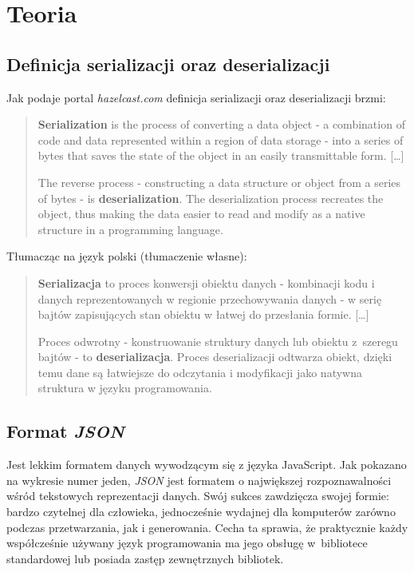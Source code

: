 \documentclass[12pt]{article}
\newcommand{\n}{\newline}
\newcommand{\nonpl}[1]{{\it #1}}
\newcommand{\JSON}{\nonpl{JSON} }
\begin{document}
	{
		\section{Teoria}

		{
			\subsection{Definicja serializacji oraz deserializacji}

			Jak podaje portal \nonpl{hazelcast.com}\cite{definitions_serial_and_deserial} definicja serializacji oraz deserializacji brzmi:

			\begin{quotation}
				{\bf Serialization} is the process of converting a data object - a combination of code
				and data represented within a region of data storage - into a series of bytes that
				saves the state of the object in an easily transmittable form. [\ldots]\n

				The reverse process - constructing a data structure or object from a series of
				bytes - is {\bf deserialization}. The deserialization process recreates the object,
				thus making the data easier to read and modify as a native structure in a programming language.
			\end{quotation}

			{\noindent Tłumacząc na język polski (tłumaczenie własne):}

			\begin{quotation}
				{\bf Serializacja} to proces konwersji obiektu danych - kombinacji kodu i danych
				reprezentowanych w regionie przechowywania danych - w serię bajtów zapisujących
				stan obiektu w łatwej do przesłania formie. [\ldots] \n

				Proces odwrotny - konstruowanie struktury danych lub obiektu z~szeregu
				bajtów - to {\bf deserializacja}. Proces deserializacji odtwarza obiekt,
				dzięki temu dane są łatwiejsze do odczytania i modyfikacji jako
				natywna struktura w języku programowania.
			\end{quotation}
		}

		{
			\newpage
			\subsection{Format \JSON}

			Jest lekkim formatem danych wywodzącym się z języka JavaScript. Jak pokazano na wykresie numer jeden,
			\JSON jest formatem o największej rozpoznawalności wśród tekstowych reprezentacji danych. Swój sukces
			zawdzięcza swojej formie: bardzo czytelnej dla człowieka, jednocześnie wydajnej dla komputerów zarówno
			podczas przetwarzania, jak i generowania. Cecha ta sprawia, że praktycznie każdy współcześnie używany język
			programowania ma jego obsługę\cite{json_short} w~bibliotece standardowej lub posiada zastęp zewnętrznych
			bibliotek.\n

}}
\end{document}
